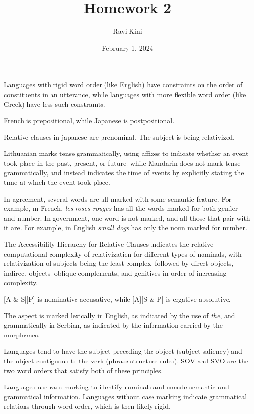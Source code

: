 \documentclass{article}
\title{Homework 2}
\author{Ravi Kini}
\date{February 1, 2024}
\begin{document}
\maketitle

\problem
Languages with rigid word order (like English) have constraints on the order of constituents in an utterance, while languages with more flexible word order (like Greek) have less such constraints.

\clearpage

\problem
French is prepositional, while Japanese is postpositional.

\clearpage

\problem
{}
Relative clauses in japanese are prenominal.
The subject is being relativized.

\clearpage

\problem
Lithuanian marks tense grammatically, using affixes to indicate whether an event took place in the past, present, or future, while Mandarin does not mark tense grammatically, and instead indicates the time of events by explicitly stating the time at which the event took place.

\clearpage

\problem
In agreement, several words are all marked with some semantic feature. For example, in French, \textit{les roses rouges} has all the words marked for both gender and number. In government, one word is not marked, and all those that pair with it are. For example, in English \textit{small dogs} has only the noun marked for number.

\clearpage

\problem
The Accessibility Hierarchy for Relative Clauses indicates the relative computational complexity of relativization for different types of nominals, with relativization of subjects being the least complex, followed by direct objects, indirect objects, oblique complements, and genitives in order of increasing complexity.

\clearpage

\problem

[A \& S][P] is nominative-accusative, while [A][S \& P] is ergative-absolutive.

\clearpage

\problem
The aspect is marked lexically in English, as indicated by the use of \textit{the}, and grammatically in Serbian, as indicated by the information carried by the morphemes.

\clearpage

\problem
Languages tend to have the subject preceding the object (subject saliency) and the object contiguous to the verb (phrase structure rules). SOV and SVO are the two word orders that satisfy both of these principles.

\clearpage

\problem
Languages use case-marking to identify nominals and encode semantic and grammatical information. Languages without case marking indicate grammatical relations through word order, which is then likely rigid.
\end{document}
